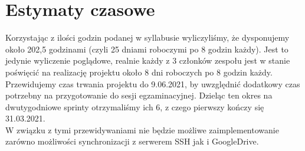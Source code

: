 \documentclass[12pt]{article}
\begin{document}
\newpage

\section{Estymaty czasowe}
Korzystając z ilości godzin podanej w syllabusie wyliczyliśmy, że dysponujemy około 202,5 godzinami (czyli 25 dniami roboczymi po 8 godzin każdy).
Jest to jedynie wyliczenie poglądowe, realnie każdy z 3 członków zespołu jest w stanie poświęcić na realizację projektu około 8 dni roboczych po 8 godzin każdy.
\\
Przewidujemy czas trwania projektu do 9.06.2021, by uwzględnić dodatkowy czas potrzebny na przygotowanie do sesji egzaminacyjnej. Dzieląc ten okres na dwutygodniowe sprinty otrzymaliśmy ich 6, z czego pierwszy kończy się 31.03.2021.
\\
W związku z tymi przewidywaniami nie będzie możliwe zaimplementowanie zarówno możliwości synchronizacji z serwerem SSH jak i GoogleDrive. 
\newpage
\end{document}
